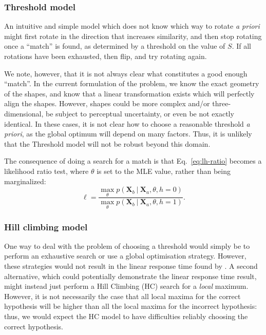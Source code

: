 \documentclass[10pt,letterpaper]{article}
\newcommand{\Xa}[0]{\mathbf{X}_a}
\newcommand{\Xb}[0]{\mathbf{X}_b}
\newcommand{\hi}[0]{h=0}
\newcommand{\hf}[0]{h=1}
\newcommand{\Th}[0]{Threshold}
\newcommand{\Hc}[0]{HC}
\begin{document}
\subsubsection{\Th{} model}

An intuitive and simple model which does not know which way to rotate
\textit{a priori} might first rotate in the direction that increases
similarity, and then stop rotating once a ``match'' is found, as
determined by a threshold on the value of $S$. If all rotations have
been exhausted, then flip, and try rotating again.

We note, however, that it is not always clear what constitutes a good
enough ``match''. In the current formulation of the problem, we know
the exact geometry of the shapes, and know that a linear
transformation exists which will perfectly align the shapes. However,
shapes could be more complex and/or three-dimensional, be subject to
perceptual uncertainty, or even be not exactly identical. In these
cases, it is not clear how to choose a reasonable threshold \textit{a
  priori}, as the global optimum will depend on many factors. Thus, it
is unlikely that the \Th{} model will not be robust beyond this
domain.

The consequence of doing a search for a match is that
Eq.~\ref{eq:lh-ratio} becomes a likelihood ratio test, where $\theta$
is set to the MLE value, rather than being marginalized:
\begin{equation}
  \ell = \frac{\max_\theta p(\Xb\ \vert\ \Xa, \theta, \hi)}{\max_\theta p(\Xb\ \vert\ \Xa, \theta, \hf)}.
  \label{eq:mle-lh-ratio}
\end{equation}

\subsubsection{Hill climbing model}

One way to deal with the problem of choosing a threshold would simply
be to perform an exhaustive search or use a global optimisation
strategy. However, these strategies would not result in the linear
response time found by . A second alternative,
which could potentially demonstrate the linear response time result,
might instead just perform a Hill Climbing (\Hc{}) search for a
\textit{local} maximum. However, it is not necessarily the case that
all local maxima for the correct hypothesis will be higher than all
the local maxima for the incorrect hypothesis: thus, we would expect
the \Hc{} model to have difficulties reliably choosing the correct
hypothesis.
\end{document}
